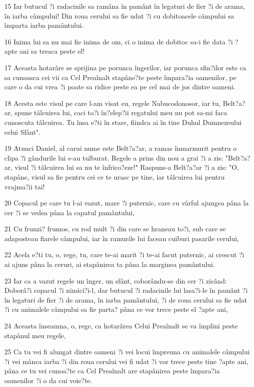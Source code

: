 \par 15 Iar butucul ?i radacinile sa ramâna în pamânt în legaturi de fier ?i de arama, în iarba câmpului! Din roua cerului sa fie udat ?i cu dobitoacele câmpului sa împarta iarba pamântului.
\par 16 Inima lui sa nu mai fie inima de om, ci o inima de dobitoc sa-i fie data ?i ?apte ani sa treaca peste el!
\par 17 Aceasta hotarâre se sprijina pe porunca îngerilor, iar porunca sfin?ilor este ca sa cunoasca cei vii ca Cel Preaînalt stapâne?te peste împara?ia oamenilor, pe care o da cui vrea ?i poate sa ridice peste ea pe cel mai de jos dintre oameni.
\par 18 Acesta este visul pe care l-am visat eu, regele Nabucodonosor, iar tu, Belt?a?ar, spune tâlcuirea lui, caci to?i în?elep?ii regatului meu nu pot sa-mi faca cunoscuta tâlcuirea. Tu însa e?ti în stare, fiindca ai în tine Duhul Dumnezeului celui Sfânt".
\par 19 Atunci Daniel, al carui nume este Belt?a?ar, a ramas înmarmurit pentru o clipa ?i gândurile lui s-au tulburat. Regele a prins din nou a grai ?i a zis: "Belt?a?ar, visul ?i tâlcuirea lui sa nu te înfrico?eze!" Raspuns-a Belt?a?ar ?i a zis: "O, stapâne, visul sa fie pentru cei ce te urasc pe tine, iar tâlcuirea lui pentru vrajma?ii tai!
\par 20 Copacul pe care tu l-ai vazut, mare ?i puternic, care cu vârful ajungea pâna la cer ?i se vedea pâna la capatul pamântului,
\par 21 Cu frunzi? frumos, cu rod mult ?i din care se hraneau to?i, sub care se adaposteau fiarele câmpului, iar în ramurile lui faceau cuiburi pasarile cerului,
\par 22 Acela e?ti tu, o, rege, tu, care te-ai marit ?i te-ai facut puternic, ai crescut ?i ai ajuns pâna la ceruri, ai stapânirea ta pâna la marginea pamântului.
\par 23 Iar ca a vazut regele un înger, un sfânt, coborându-se din cer ?i zicând: Doborâ?i copacul ?i nimici?i-l, dar butucul ?i radacinile lui lasa?i-le în pamânt ?i în legaturi de fier ?i de arama, în iarba pamântului, ?i de roua cerului sa fie udat ?i cu animalele câmpului sa fie parta? pâna ce vor trece peste el ?apte ani,
\par 24 Aceasta înseamna, o, rege, ca hotarârea Celui Preaînalt se va împlini peste stapânul meu regele,
\par 25 Ca tu vei fi alungat dintre oameni ?i vei locui împreuna cu animalele câmpului ?i vei mânca iarba ?i din roua cerului vei fi udat ?i vor trece peste tine ?apte ani, pâna ce tu vei cunoa?te ca Cel Preaînalt are stapânirea peste împara?ia oamenilor ?i o da cui voie?te.
